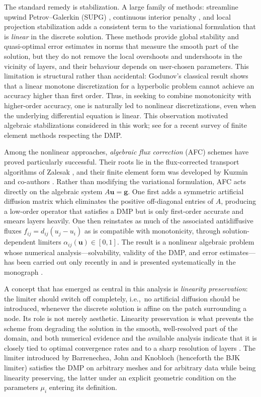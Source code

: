 \documentclass[a4paper]{article}
\theoremstyle{plain}
\theoremstyle{definition}
\theoremstyle{remark}
\begin{document}
The standard remedy is stabilization. A large family of methods: streamline upwind
Petrov--Galerkin (SUPG) \cite{BH82},  continuous interior penalty
\cite{BE07}, 
and local projection stabilization \cite{Kn10} adds a consistent term to the variational
formulation that is \emph{linear} in the discrete solution. These methods provide
global stability and quasi-optimal error estimates in norms that measure the smooth
part of the solution, but they do not remove the local overshoots and undershoots in
the vicinity of layers, and their behaviour depends on user-chosen parameters. This limitation is structural rather than accidental: Godunov's classical result shows that a linear monotone discretization for a hyperbolic problem cannot achieve an accuracy higher than first order. Thus, in seeking to combine monotonicity with higher-order accuracy, one is naturally led to nonlinear discretizations, even when the underlying differential equation is linear.  This observation motivated  algebraic stabilizations considered in this work; see \cite{BJK24} for a recent survey of finite element methods respecting the DMP.

Among the nonlinear approaches, \emph{algebraic flux correction} (AFC) schemes have
proved particularly successful. Their roots lie in the flux-corrected transport
algorithms of Zalesak \cite{Zal79}, and their finite element form was
developed by Kuzmin and co-authors \cite{KM05, Ku06, Ku09}. Rather than modifying the variational formulation, AFC acts
directly on the algebraic system $A\boldsymbol{u}=\boldsymbol{g}$. One first adds a
symmetric artificial diffusion matrix which eliminates the positive off-diagonal
entries of $A$, producing a low-order operator that satisfies a DMP but is only
first-order accurate and smears layers heavily. One then reinstates as much of the
associated antidiffusive fluxes $f_{ij}=d_{ij}(u_j-u_i)$ as is compatible with
monotonicity, through solution-dependent limiters $\alpha_{ij}(\boldsymbol{u})\in[0,1]$.
The result is a nonlinear algebraic problem whose numerical analysis---solvability,
validity of the DMP, and error estimates---has been carried out only recently in
\cite{BJK16} and is presented systematically in the monograph
\cite{BJK25}.

A concept that has emerged as central in this analysis is \emph{linearity preservation}: the limiter should switch off completely, i.e.,\ no artificial diffusion should be introduced, whenever the discrete solution is affine on the patch surrounding a node. Its role is not merely aesthetic. Linearity preservation is what prevents the scheme from degrading the solution in the smooth, well-resolved part of
the domain, and both numerical evidence and the available analysis indicate that it is
closely tied to optimal convergence rates and to a sharp resolution of layers
\cite{BJK17,BJK25}. The limiter introduced by Barrenechea, John and Knobloch (henceforth the BJK limiter) satisfies the DMP on arbitrary meshes and for arbitrary data while being linearity preserving, the latter under an explicit geometric condition on the parameters $\mu_i$ entering its definition.
\end{document}

